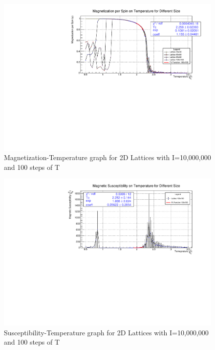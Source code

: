 \documentclass[11pt,a4paper]{article}
\begin{document}
\begin{figure}[h!]
  \centering
  \includegraphics[width=\columnwidth]{img/2d/c2.pdf}
  \caption{Magnetization-Temperature graph for 2D Lattices with I=10,000,000 and 100 steps of T}
\end{figure}

\begin{figure}[h!]
  \centering
  \includegraphics[width=\columnwidth]{img/2d/c3.pdf}
  \caption{Susceptibility-Temperature graph for 2D Lattices with I=10,000,000 and 100 steps of T}
\end{figure}
\end{document}
